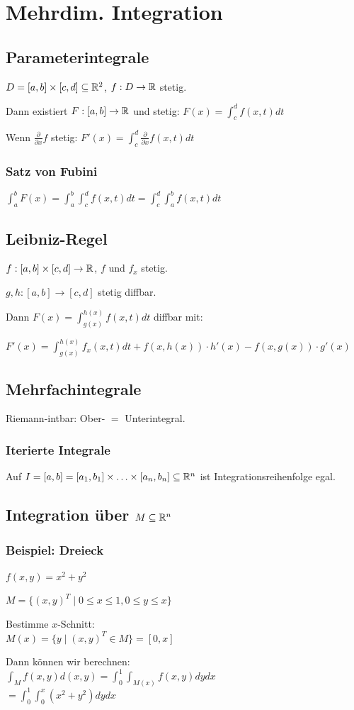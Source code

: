 \section*{Mehrdim. Integration}

\subsection*{Parameterintegrale}
$D=[a,b]\times[c,d]\subseteq\mathbb{R}^2$, $f:D\to\mathbb{R}$ stetig.

Dann existiert $F:[a,b]\to\mathbb{R}$ und stetig:
$F(x)=\int_c^d f(x,t)dt$

Wenn $\frac{\partial}{\partial x}f$ stetig:
$F'(x) = \int_c^d \frac{\partial}{\partial x}f(x,t)dt$

\subsubsection*{Satz von Fubini}
$\int_a^b F(x) = \int_a^b \int_c^d f(x,t)dt = \int_c^d \int_a^b f(x,t)dt$

\subsection*{Leibniz-Regel}
$f:[a,b]\times[c,d]\to\mathbb{R}$, $f$ und $f_x$ stetig.

$g,h: [a,b] \to [c,d]$ stetig diffbar.

Dann $F(x)=\int_{g(x)}^{h(x)}f(x,t)dt$ diffbar mit:

$F'(x) = \int_{g(x)}^{h(x)} f_x(x,t)dt + f(x,h(x))\cdot h'(x) - f(x,g(x))\cdot g'(x)$

\subsection*{Mehrfachintegrale}

Riemann-intbar: Ober- $=$ Unterintegral.

\subsubsection*{Iterierte Integrale}
Auf $I=[a,b]=[a_1,b_1]\times\ldots\times[a_n,b_n]\subseteq\mathbb{R}^n$ ist Integrationsreihenfolge egal.

\subsection*{Integration über $M \subseteq \mathbb{R}^n$}

\subsubsection*{Beispiel: Dreieck}
$f(x,y) = x^2 + y^2$

$M = \{(x,y)^T \mid 0 \le x \le 1, 0 \le y \le x \}$

Bestimme $x$-Schnitt: \\
$M(x) = \{y \mid (x,y)^T \in M \} = [0,x]$

Dann können wir berechnen: \\
$\int_M f(x,y)d(x,y) = \int_0^1 \int_{M(x)}f(x,y)dydx$ \\
$ = \int_0^1 \int_0^x (x^2+y^2)dydx$
